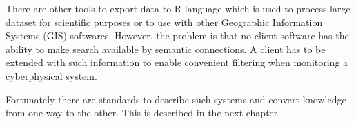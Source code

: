There are other tools to export data to R language which is used to process large dataset for scientific purposes or to use with other Geographic Information Systems (GIS) softwares. However, the problem is that no client software has the ability to make search available by semantic connections. A client has to be extended with such information to enable convenient filtering when monitoring a cyberphysical system.

Fortunately there are standards to describe such systems and convert knowledge from one way to the other. This is described in the next chapter.
